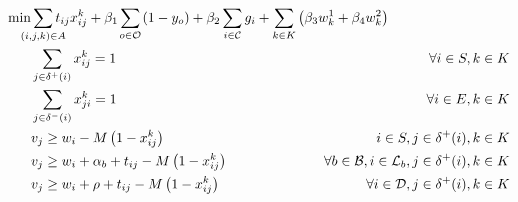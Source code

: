 \begin{alignat}{3}
    \label{mod:obj}   \min & \smashoperator{ \sum_{ \substack{(i,j,k) \in A} }} {t_{ij}x^{k}_{ij}} + \beta_1\smashoperator{\sum_{ o \in \mathcal{O}}}{  \left(1-y_o\right)} \hspace{-0mm}  + \beta_2 \smashoperator{ \sum_{i \in \mathcal{C} } } { g_i  } +  \sum_{k \in K}\left({\beta_3 w^{1}_k  + \beta_4  w^{2}_k}\right) &                                                                                                  \\
    \label{mod:c1}         & \sum_{j \in \delta^{+}(i) }{x^k_{ij}} =1                                                                                                                                                                                                                                                         & \forall i \in S, k \in K                                                                         \\
    \label{mod:c2}         & \sum_{j \in \delta^{-}(i)}{x^k_{ji}} = 1                                                                                                                                                                                                                                                         & \forall i \in E, k \in K                                                                         \\
    \label{mod:c03}        & v_j \geq  w_i  - M\left(1-x^{k}_{ij}\right)                                                                                                                                                                                                                                                      & \hspace{-20mm}  i \in S, j \in \delta^{+}(i),  k \in K                                           \\
    \label{mod:c3}         & v_j \geq  w_i + \alpha_{b} + t_{ij} - M\left(1-x^{k}_{ij}\right)                                                                                                                                                                                                                                 & \hspace{-20mm} \forall b \in \mathcal{B}, i \in \mathcal{L}_b, j \in \delta^{+}(i),  k \in K     \\
    \label{mod:c4}         & v_j \geq  w_i + \rho + t_{ij} - M\left(1-x^{k}_{ij}\right)                                                                                                                                                                                                                                       & \hspace{-20mm} \forall i \in \mathcal{D}  , j \in \delta^{+}(i), k \in K                         \\

\end{alignat}
